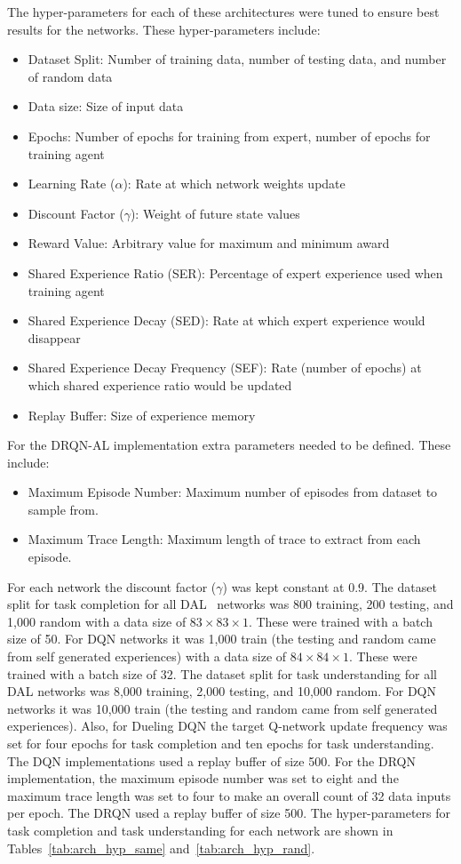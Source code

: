 \documentclass[12pt,american]{report}
\begin{document}
The hyper-parameters for each of these architectures were tuned to ensure best results for the networks.  These hyper-parameters include:
\begin{itemize}
  \item Dataset Split: Number of training data, number of testing data, and number of random data
  \item Data size: Size of input data
  \item Epochs: Number of epochs for training from expert, number of epochs for training agent
  \item Learning Rate ($\alpha$): Rate at which network weights update
  \item Discount Factor ($\gamma$): Weight of future state values
  \item Reward Value: Arbitrary value for maximum and minimum award
  \item Shared Experience Ratio (SER): Percentage of expert experience used when training agent
  \item Shared Experience Decay (SED): Rate at which expert experience would disappear
  \item Shared Experience Decay Frequency (SEF): Rate (number of epochs) at which shared experience ratio would be updated
  \item Replay Buffer: Size of experience memory
\end{itemize}
For the DRQN-AL implementation extra parameters needed to be defined.  These include:
\begin{itemize}
	\item Maximum Episode Number: Maximum number of episodes from dataset to sample from.
	\item Maximum Trace Length: Maximum length of trace to extract from each episode.
\end{itemize}

For each network the discount factor ($\gamma$) was kept constant at 0.9.  The dataset split for task completion for all DAL~\cite{markovikj2014deep} networks was 800 training, 200 testing, and 1,000 random with a data size of $83\times 83\times 1$.  These were trained with a batch size of 50. For DQN networks it was 1,000 train (the testing and random came from self generated experiences) with a data size of $84\times 84\times 1$. These were trained with a batch size of 32. The dataset split for task understanding for all DAL networks was 8,000 training, 2,000 testing, and 10,000 random. For DQN networks it was 10,000 train (the testing and random came from self generated experiences).  Also, for Dueling DQN the target Q-network update frequency was set for four epochs for task completion and ten epochs for task understanding. The DQN implementations used a replay buffer of size 500. For the DRQN implementation, the maximum episode number was set to eight and the maximum trace length was set to four to make an overall count of 32 data inputs per epoch. The DRQN used a replay buffer of size 500. The hyper-parameters for task completion and task understanding for each network are shown in Tables~\ref{tab:arch_hyp_same} and~\ref{tab:arch_hyp_rand}.  
\end{document}
